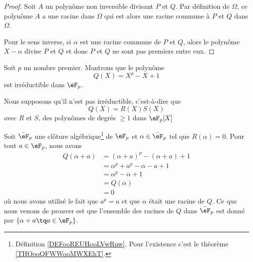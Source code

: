 \begin{proof}
	Soit \( A\) un polynôme non inversible divisant \( P\) et \( Q\). Par définition de \( \Omega\), ce polynôme \( A\) a une racine dans \( \Omega\) qui est alors une racine commune à \( P\) et \( Q\) dans \( \Omega\).

	Pour le sens inverse, si \( \alpha\) est une racine commune de \( P\) et \( Q\), alors le polynôme \( X-\alpha\) divise \( P\) et \( Q\) et donc \( P\) et \( Q \) ne sont pas premiers entre eux.
\end{proof}

\begin{example}     \label{ExfUqQXQ}
	Soit \( p\) un nombre premier. Montrons que le polynôme
	\begin{equation}
		Q(X)=X^p-X+1
	\end{equation}
	est irréductible dans \( \eF_p\).

	Nous supposons qu'il n'est pas irréductible, c'est-à-dire que
	\begin{equation}
		Q(X)=R(X)S(X)
	\end{equation}
	avec \( R\) et \( S\), des polynômes de degrés \( \geq 1\) dans \( \eF_p[X]\)

	Soit \( \bar\eF_p\) une clôture algébrique\footnote{Définition \ref{DEFooREUHooLVwRuw}. Pour l'existence c'est le théorème \ref{THOooQFWWooMWXEhT}.} de \( \eF_p\) et \( \alpha\in \bar \eF_p\) tel que \( R(\alpha)=0\). Pour tout \( a\in \eF_p\), nous avons
	\begin{subequations}
		\begin{align}
			Q(\alpha+a) & =(\alpha+a)^p-(\alpha+a)+1 \\
			            & =\alpha^p+a^p-\alpha-a+1   \\
			            & =\alpha^p-\alpha+1         \\
			            & =Q(\alpha)                 \\
			            & =0
		\end{align}
	\end{subequations}
	où nous avons utilisé le fait que \( a^p=a\) et que \( \alpha\) était une racine de \( Q\). Ce que nous venons de prouver est que l'ensemble des racines de \( Q\) dans \( \bar\eF_p\) est donné par \( \{ \alpha+a\tq a\in \eF_p \}\).


\end{example}
